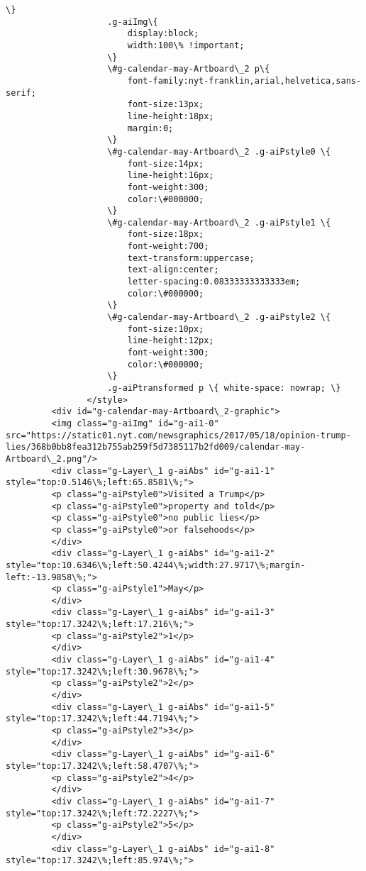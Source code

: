 \documentclass[11pt]{article}
\begin{document}
\begin{Verbatim}[commandchars=\\\{\}]
         			\}
         			.g-aiImg\{
         				display:block;
         				width:100\% !important;
         			\}
         			\#g-calendar-may-Artboard\_2 p\{
         				font-family:nyt-franklin,arial,helvetica,sans-serif;
         				font-size:13px;
         				line-height:18px;
         				margin:0;
         			\}
         			\#g-calendar-may-Artboard\_2 .g-aiPstyle0 \{
         				font-size:14px;
         				line-height:16px;
         				font-weight:300;
         				color:\#000000;
         			\}
         			\#g-calendar-may-Artboard\_2 .g-aiPstyle1 \{
         				font-size:18px;
         				font-weight:700;
         				text-transform:uppercase;
         				text-align:center;
         				letter-spacing:0.08333333333333em;
         				color:\#000000;
         			\}
         			\#g-calendar-may-Artboard\_2 .g-aiPstyle2 \{
         				font-size:10px;
         				line-height:12px;
         				font-weight:300;
         				color:\#000000;
         			\}
         			.g-aiPtransformed p \{ white-space: nowrap; \}
         		</style>
         <div id="g-calendar-may-Artboard\_2-graphic">
         <img class="g-aiImg" id="g-ai1-0" src="https://static01.nyt.com/newsgraphics/2017/05/18/opinion-trump-lies/368b0bb8fea312b755ab259f5d7385117b2fd009/calendar-may-Artboard\_2.png"/>
         <div class="g-Layer\_1 g-aiAbs" id="g-ai1-1" style="top:0.5146\%;left:65.8581\%;">
         <p class="g-aiPstyle0">Visited a Trump</p>
         <p class="g-aiPstyle0">property and told</p>
         <p class="g-aiPstyle0">no public lies</p>
         <p class="g-aiPstyle0">or falsehoods</p>
         </div>
         <div class="g-Layer\_1 g-aiAbs" id="g-ai1-2" style="top:10.6346\%;left:50.4244\%;width:27.9717\%;margin-left:-13.9858\%;">
         <p class="g-aiPstyle1">May</p>
         </div>
         <div class="g-Layer\_1 g-aiAbs" id="g-ai1-3" style="top:17.3242\%;left:17.216\%;">
         <p class="g-aiPstyle2">1</p>
         </div>
         <div class="g-Layer\_1 g-aiAbs" id="g-ai1-4" style="top:17.3242\%;left:30.9678\%;">
         <p class="g-aiPstyle2">2</p>
         </div>
         <div class="g-Layer\_1 g-aiAbs" id="g-ai1-5" style="top:17.3242\%;left:44.7194\%;">
         <p class="g-aiPstyle2">3</p>
         </div>
         <div class="g-Layer\_1 g-aiAbs" id="g-ai1-6" style="top:17.3242\%;left:58.4707\%;">
         <p class="g-aiPstyle2">4</p>
         </div>
         <div class="g-Layer\_1 g-aiAbs" id="g-ai1-7" style="top:17.3242\%;left:72.2227\%;">
         <p class="g-aiPstyle2">5</p>
         </div>
         <div class="g-Layer\_1 g-aiAbs" id="g-ai1-8" style="top:17.3242\%;left:85.974\%;">

\end{Verbatim}
\end{document}
